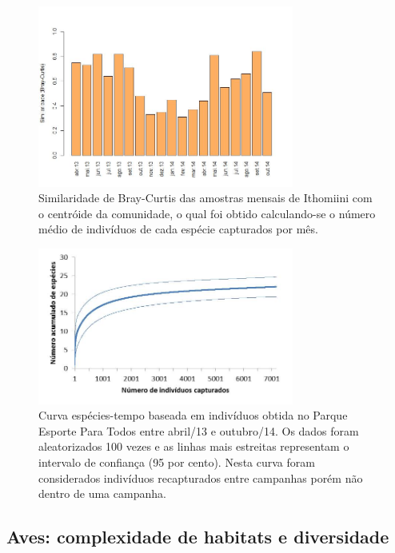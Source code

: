 \documentclass[12pt, A4]{article}
\begin{document}
\begin{figure}
  \centering
  \includegraphics[width=0.75\textwidth]{figures/Imagem6/Imagem6.jpg}
  \caption{Similaridade de Bray-Curtis das amostras mensais de Ithomiini com o centróide da comunidade, o qual foi obtido calculando-se o número médio de indivíduos de cada espécie capturados por mês.}
  \label{fig:2.1.5} 
\end{figure}

\begin{figure}
  \centering
\includegraphics[width=0.75\textwidth]{figures/Imagem7/Imagem7.jpg}
  \caption{Curva espécies-tempo baseada em indivíduos obtida no Parque Esporte Para Todos entre abril/13 e outubro/14. Os dados foram aleatorizados 100 vezes e as linhas mais estreitas representam o intervalo de confiança (95 por cento). Nesta curva foram considerados indivíduos recapturados entre campanhas porém não dentro de uma campanha.}
  \label{fig:2.1.6} 
\end{figure}


\subsection{Aves: complexidade de habitats e diversidade} %
\label{sec:compl-de-habit} 
\end{document}
